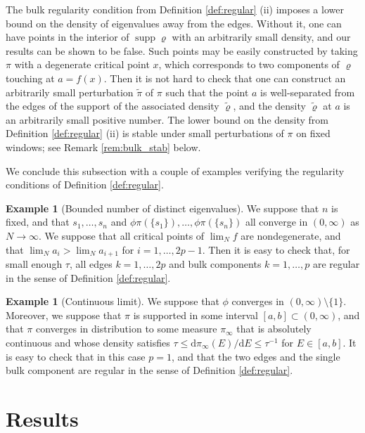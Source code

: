 \documentclass[11pt]{article} %
\numberwithin{equation}{section}
\numberwithin{figure}{section}
\theoremstyle{plain} %
\theoremstyle{definition} %
\newtheorem{example}[theorem]{Example}
\newcommand{\dd}{\mathrm{d}}
\renewcommand{\leq}{\leqslant}
\DeclareMathOperator{\supp}{supp}
\begin{document}
The bulk regularity condition from Definition \ref{def:regular} (ii) imposes a lower bound on the density of eigenvalues away from the edges. Without it, one can have points in the interior of $\supp \varrho$ with an arbitrarily small density, and our results can be shown to be false. Such points may be easily constructed by taking $\pi$ with a degenerate critical point $x$, which corresponds to two components of $\varrho$ touching at $a = f(x)$. Then it is not hard to check that one can construct an arbitrarily small perturbation $\tilde \pi$ of $\pi$ such that the point $a$ is well-separated from the edges of the support of the associated density $\tilde \varrho$, and the density $\tilde \varrho$ at $a$ is an arbitrarily small positive number. The lower bound on the density from Definition \ref{def:regular} (ii) is stable under small perturbations of $\pi$ on fixed windows; see Remark \ref{rem:bulk_stab} below.

We conclude this subsection with a couple of examples verifying the regularity conditions of Definition \ref{def:regular}.

\begin{example}[Bounded number of distinct eigenvalues]
We suppose that $n$ is fixed, and that $s_1, \dots, s_n$ and $\phi \pi(\{s_1\}), \dots, \phi \pi(\{s_n\})$ all converge in $(0,\infty)$ as $N \to \infty$.
We suppose that all critical points of $\lim_N f$ are nondegenerate, and that  $\lim_N a_i > \lim_N a_{i+1}$ for $i = 1, \dots, 2p - 1$. Then it is easy to check that, for small enough $\tau$, all edges $k = 1, \dots, 2p$ and bulk components $k = 1, \dots, p$ are regular in the sense of Definition \ref{def:regular}.
\end{example}

\begin{example}[Continuous limit]
We suppose that  $\phi$ converges in $(0,\infty) \setminus \{1\}$. Moreover, we suppose that $\pi$ is supported in some interval $[a, b] \subset (0,\infty)$, and that $\pi$ converges in distribution to some measure $\pi_\infty$ that is absolutely continuous and whose density satisfies $\tau \leq \dd \pi_\infty (E) / \dd E \leq \tau^{-1}$ for $E \in [a,b]$.  It is easy to check that in this case $p=1$, and that the two edges and the single bulk component are regular in the sense of Definition \ref{def:regular}.
\end{example}


\section{Results}
\end{document}
